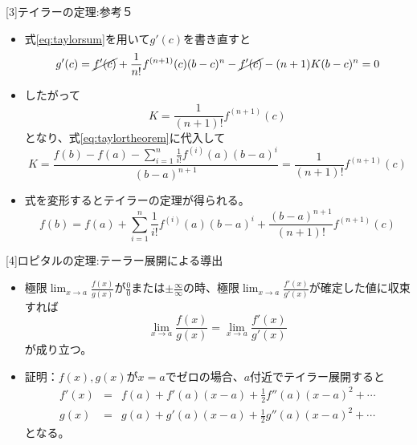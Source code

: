 \begin{slide}{[3]テイラーの定理:参考５}
\begin{itemize}
\item 式\ref{eq:taylorsum}を用いて$g'(c)$を書き直すと
\begin{equation}
g'(c) = \cancel{f'(c)} + \frac{1}{n!}f^{(n+1)}(c)(b-c)^n - \cancel{f'(c)} - (n+1)K(b-c)^{n} = 0 \nonumber 
\end{equation}
\item したがって
\begin{equation}
K = \frac{1}{(n+1)!}f^{(n+1)}(c) \nonumber 
\end{equation}
となり、式\ref{eq:taylortheorem}に代入して
\begin{equation}
K = \frac{f(b) - f(a) - \sum_{i=1}^n \frac{1}{i!}f^{(i)}(a)(b-a)^i }{(b-a)^{n+1}}  = \frac{1}{(n+1)!}f^{(n+1)}(c) \nonumber
\end{equation}
\item 式を変形するとテイラーの定理が得られる。
\begin{equation}
f(b) = f(a) + \sum_{i=1}^n \frac{1}{i!}f^{(i)}(a)(b-a)^i  + \frac{(b-a)^{n+1}}{(n+1)!}f^{(n+1)}(c) \nonumber
\end{equation}
\end{itemize}
\end{slide}
\begin{slide}{[4]ロピタルの定理:テーラー展開による導出}
\begin{itemize}
\item 極限$\lim_{x \to a}\frac{f(x)}{g(x)}$が$\frac{0}{0}$または$\pm\frac{\infty}{\infty}$の時、極限$\lim_{x\to a}\frac{f'(x)}{g'(x)}$が確定した値に収束すれば
\begin{equation}
\lim_{x\to a} \frac{f(x)}{g(x)} = \lim_{x\to a}\frac{f'(x)}{g'(x)}
\end{equation}
が成り立つ。
\item 証明：$f(x), g(x)$が$x=a$でゼロの場合、$a$付近でテイラー展開すると
\begin{eqnarray}
f'(x) &=& f(a) + f'(a) (x-a) + \frac{1}{2}f''(a)(x-a)^2 + \cdots \nonumber \\
g(x) &=& g(a) + g'(a)(x-a) +  \frac{1}{2}g''(a)(x-a)^2 + \cdots \nonumber
\end{eqnarray}
となる。
\end{itemize}
\end{slide}










